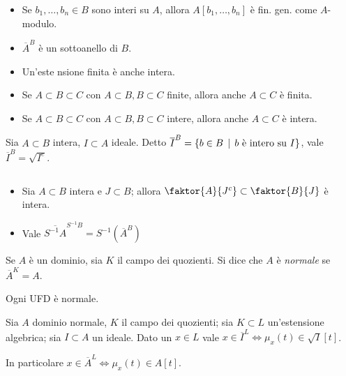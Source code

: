 \begin{proposition}$ $
    \begin{itemize}
        \item Se $b_1,\dots, b_n\in B$ sono interi su $A$, allora $A[b_1,\dots,b_n]$ è fin. gen. come $A$-modulo.
        \item $\overline{A}^B$ è un sottoanello di $B$.
        \item Un'este  nsione finita è anche intera.
        \item Se $A\subset B\subset C$ con $A\subset B, B\subset C$ finite, allora anche $A\subset C$ è finita.
        \item Se $A\subset B\subset C$ con $A\subset B, B\subset C$ intere, allora anche $A\subset C$ è intera.
    \end{itemize}
\end{proposition}

\begin{lemma}
    Sia $A\subset B$ intera, $I\subset A$ ideale. Detto $\overline{I}^B=\{ b\in B \operatorname{\; |\;} b \text{ è intero su } I \}$, vale $\overline{I}^B = \sqrt{I^e}$.
\end{lemma}

\begin{proposition}$ $
    \begin{itemize}
        \item Sia $A\subset B$ intera e $J\subset B$; allora $\faktor{A}{J^c}\subset \faktor{B}{J}$ è intera.
        \item Vale $\overline{S^{-1}A}^{S^{-1}B}=S^{-1}(\overline{A}^B) $
    \end{itemize}
\end{proposition}

\begin{definition}
    Se $A$ è un dominio, sia $K$ il campo dei quozienti. Si dice che $A$ è \emph{normale} se $\overline{A}^K=A$.
\end{definition}

\begin{proposition}
    Ogni UFD è normale.
\end{proposition}

\begin{theorem}
    Sia $A$ dominio normale, $K$ il campo dei quozienti; sia $K\subset L$ un'estensione algebrica; sia $I\subset A$ un ideale. Dato un $x\in L$ vale $x\in \overline{I}^L \iff \mu_x(t)\in \sqrt{I}[t]$.
    
    In particolare $x\in \overline{A}^L \iff \mu_x(t)\in A[t]$.
\end{theorem}

